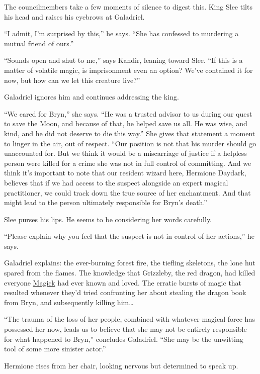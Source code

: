 \documentclass[smalldemyvopaper,11pt,twoside,onecolumn,openright,extrafontsizes]{memoir}
\begin{document}
The councilmembers take a few moments of silence to digest this. King
Slee tilts his head and raises his eyebrows at Galadriel.

``I admit, I'm surprised by this,'' he says. ``She has confessed to
murdering a mutual friend of ours.''

``Sounds open and shut to me,'' says Kandir, leaning toward Slee. ``If
this is a matter of volatile magic, is imprisonment even an option?
We've contained it for now, but how can we let this creature live?''

Galadriel ignores him and continues addressing the king.

``We cared for Bryn,'' she says. ``He was a trusted advisor to us during
our quest to save the Moon, and because of that, he helped save us all.
He was wise, and kind, and he did not deserve to die this way.'' She
gives that statement a moment to linger in the air, out of respect.
``Our position is not that his murder should go unaccounted for. But we
think it would be a miscarriage of justice if a helpless person were
killed for a crime she was not in full control of committing. And we
think it's important to note that our resident wizard here, Hermione
Daydark, believes that if we had access to the suspect alongside an
expert magical practitioner, we could track down the true source of her
enchantment. And that might lead to the person ultimately responsible
for Bryn's death.''

Slee purses his lips. He seems to be considering her words carefully.

``Please explain why you feel that the suspect is not in control of her
actions,'' he says.

Galadriel explains: the ever-burning forest fire, the tiefling
skeletons, the lone hut spared from the flames. The knowledge that
Grizzleby, the red dragon, had killed everyone
\href{/characters/magick/}{Magick} had ever known and loved. The erratic
bursts of magic that resulted whenever they'd tried confronting her
about stealing the dragon book from Bryn, and subsequently killing
him\ldots{}

``The trauma of the loss of her people, combined with whatever magical
force has possessed her now, leads us to believe that she may not be
entirely responsible for what happened to Bryn,'' concludes Galadriel.
``She may be the unwitting tool of some more sinister actor.''

Hermione rises from her chair, looking nervous but determined to speak
up.
\end{document}
